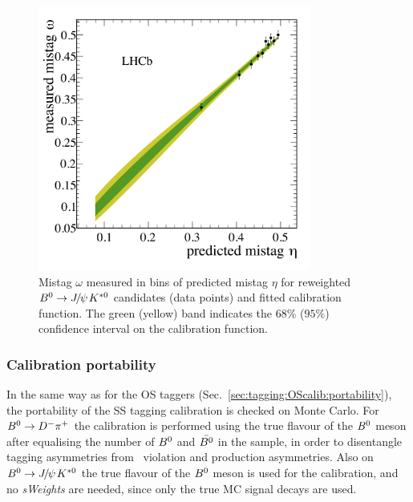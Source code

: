 \begin{figure}[tbp]
	\begin{center}
		\includegraphics[width=0.80\textwidth]{04Flavourtagging/figs/SScalib.png}
	\end{center}
        \vspace{-2mm}
	\caption{Mistag $\omega$ measured in bins of predicted mistag $\eta$ for reweighted $\Bz\to\jpsi\Kstarz$ candidates (data points) and fitted calibration function. The green (yellow) band indicates the $68\%$ ($95\%$) confidence interval on the calibration function.}	
	\label{fig:calibrationSScombination}
\end{figure}
\subsubsection{Calibration portability}
\label{sec:tagging:SScalib:portability}

In the same way as for the OS taggers (Sec.~\ref{sec:tagging:OScalib:portability}), the portability of the SS tagging calibration is checked on Monte Carlo. 
For $B^0\rightarrow D^-\pi^+$ the calibration is performed using the true flavour of the $B^0$ meson after
equalising the number of $B^0$ and $\bar{B^0}$ in the sample, in order to disentangle tagging asymmetries from \CP~violation
and production asymmetries. Also on $\Bz\to\jpsi\Kstarz$ the true flavour of the $B^0$ meson is used for the calibration, and
no \emph{sWeights} are needed, since only the true MC signal decays are used.

